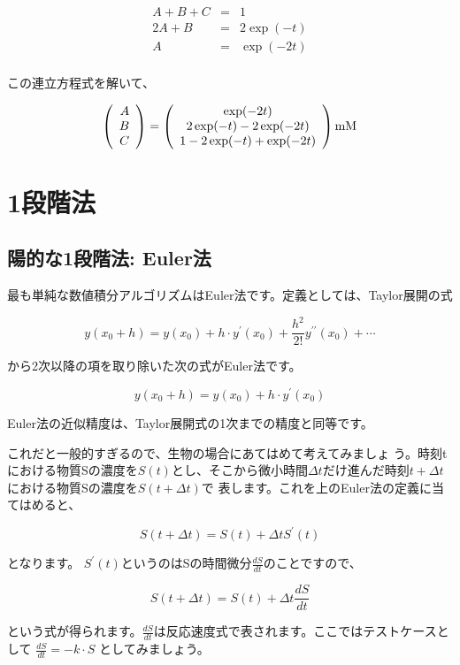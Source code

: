 \begin{eqnarray*}
A + B + C & = & 1 \\
2A + B    & = & 2 \exp(-t) \\
A         & = & \exp(-2t)\\ 
\end{eqnarray*}

この連立方程式を解いて、

\[
\left(
\begin{array}{r}
A \\ 
B \\
C \\
\end{array}
\right)
=
\left(
\begin{array}{c}
\exp(-2t) \\
2\exp(-t) - 2\exp(-2t) \\
1 - 2\exp(-t) + \exp(-2t) \\
\end{array}
\right) {\rm mM}
\]

\section{1段階法}
\subsection{陽的な1段階法: Euler法}
最も単純な数値積分アルゴリズムはEuler法です。定義としては、Taylor展開の式

\[y(x_0 + h) = y(x_0) + h \cdot y^{\prime}(x_0) + \frac{h^2}{2!} y^{\prime  \prime}(x_0) + \cdots\]

から2次以降の項を取り除いた次の式がEuler法です。

\[y(x_0 + h) = y(x_0) + h \cdot y^{\prime}(x_0) \]

Euler法の近似精度は、Taylor展開式の1次までの精度と同等です。

\indent これだと一般的すぎるので、生物の場合にあてはめて考えてみましょ
う。時刻tにおける物質Sの濃度を\(S(t)\)とし、そこから微小時間\(\Delta
t\)だけ進んだ時刻\(t+\Delta t\)における物質Sの濃度を\(S(t+\Delta t)\)で
表します。これを上のEuler法の定義に当てはめると、

\[S(t+\Delta t) = S(t) + \Delta t S^{\prime}(t)\]

となります。 \(S^{\prime}(t)\)というのはSの時間微分\(\displaystyle\frac{dS}{dt}\)のことですので、

\[S(t+\Delta t) = S(t) + \Delta t \frac{dS}{dt}\]

という式が得られます。\(\displaystyle\frac{dS}{dt}\)は反応速度式で表されます。ここではテストケースとして \(\displaystyle\frac{dS}{dt} = -k \cdot S\) としてみましょう。

